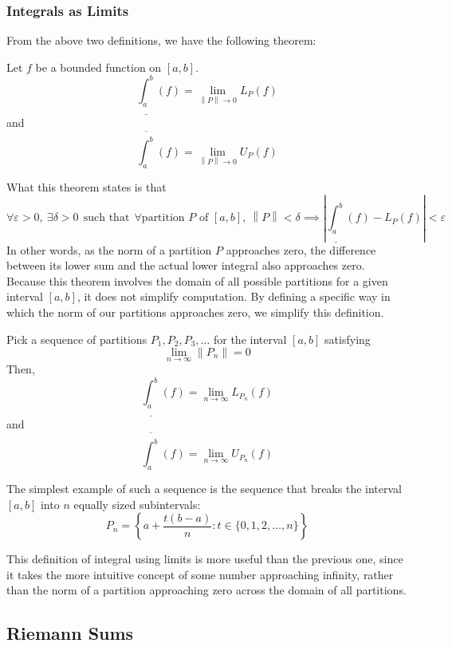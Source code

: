 \documentclass[11pt]{article}
\newenvironment{theorem}[1][]{\begin{tcolorbox}[colframe=_blue,colback=_blue2,title=Theorem. \ifthenelse{\isempty{#1}}{}{(#1)}
]}{\end{tcolorbox}}
\newcommand\norm[1]{\left\lVert#1\right\rVert}
\newcommand{\hr}{\noindent\makebox[\linewidth]{\rule{\textwidth}{0.4pt}}\par\vspace{0.1in}}
\newcommand{\emptyline}[0]{\\\hfill$~$\\}
\begin{document}
\subsubsection{Integrals as Limits}
From the above two definitions, we have the following theorem:
\begin{theorem}
    Let $f$ be a bounded function on $[a,b]$.
    $$
        \underline{\int_a^b}(f)=\lim_{\norm{P}\to 0} L_P(f)
    $$
    and
    $$
        \overline{\int_a^b}(f)=\lim_{\norm{P}\to 0} U_P(f)
    $$
\end{theorem}
What this theorem states is that
$$
    \forall \varepsilon>0,~\exists \delta>0~~\text{such that}~~\forall\text{partition $P$ of $[a,b]$},~\norm{P}<\delta\implies \left|\underline{\int_a^b}(f)-L_P(f)\right|<\varepsilon
$$
In other words, as the norm of a partition $P$ approaches zero, the difference between its lower sum and the actual lower integral also approaches zero.
\emptyline
Because this theorem involves the domain of all possible partitions for a given interval $[a,b]$, it does not simplify computation. By defining a specific way in which the norm of our partitions approaches zero, we simplify this definition.
\begin{theorem}
    Pick a sequence of partitions $P_1,P_2,P_3,\dots$ for the interval $[a,b]$ satisfying
    $$
        \lim_{n\to\infty}\norm{P_n}=0
    $$
    Then,
    $$
        \underline{\int_a^b}(f)=\lim_{n\to\infty}L_{P_n}(f)
    $$
    and
    $$
        \overline{\int_a^b}(f)=\lim_{n\to\infty}U_{P_n}(f)
    $$
    \hr
    The simplest example of such a sequence is the sequence that breaks the interval $[a,b]$ into $n$ equally sized subintervals:
    $$
        P_n=\left\{a+\frac{t(b-a)}{n}:t\in\{0,1,2,\dots,n\}\right\}
    $$
\end{theorem}
This definition of integral using limits is more useful than the previous one, since it takes the more intuitive concept of some number approaching infinity, rather than the norm of a partition approaching zero across the domain of all partitions.
\subsection{Riemann Sums}
\end{document}
